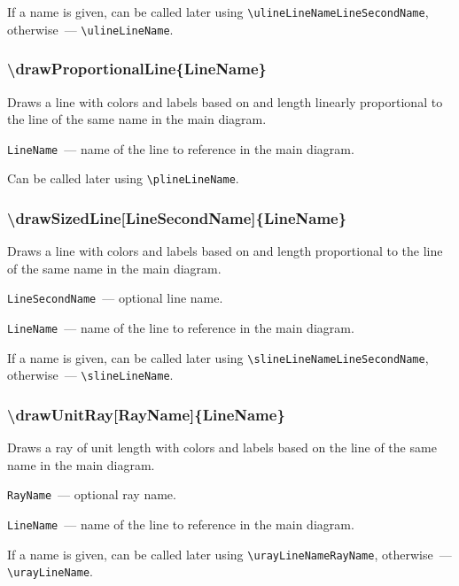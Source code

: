 	If a name is given, can be called later using \texttt{\textbackslash ulineLineNameLineSecondName}, otherwise~— \texttt{\textbackslash ulineLineName}. 

\subsubsection{\textbackslash drawProportionalLine\{LineName\}}

	Draws a line with colors and labels based on and length linearly proportional to the line of the same name in the main diagram.

	\texttt{LineName}~— name of the line to reference in the main diagram. 
	
	Can be called later using \texttt{\textbackslash plineLineName}.


\subsubsection{\textbackslash drawSizedLine[LineSecondName]\{LineName\}}

	Draws a line with colors and labels based on and length proportional to the line of the same name in the main diagram.

	\texttt{LineSecondName}~— optional line name. 
	
	\texttt{LineName}~— name of the line to reference in the main diagram. 
	
	If a name is given, can be called later using \texttt{\textbackslash slineLineNameLineSecondName}, otherwise~— \texttt{\textbackslash slineLineName}. 

\subsubsection{\textbackslash drawUnitRay[RayName]\{LineName\}}

	Draws a ray of unit length with colors and labels based on the line of the same name in the main diagram.

	\texttt{RayName}~— optional ray name.
	
	\texttt{LineName}~— name of the line to reference in the main diagram. 

	If a name is given, can be called later using \texttt{\textbackslash urayLineNameRayName}, otherwise~— \texttt{\textbackslash urayLineName}. 


